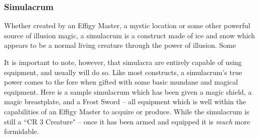 % 
\subsubsection{Simulacrum}
Whether created by an Effigy Master, a mystic location or some other powerful source of illusion magic, a simulacrum is a construct made of ice and snow which appears to be a normal living creature through the power of illusion. Some 

\noindent{}

It is important to note, however, that simulacra are entirely capable of using equipment, and usually will do so. Like most constructs, a simulacrum's true power comes to the fore when gifted with some basic mundane and magical equipment. Here is a sample simulacrum which has been given a magic shield, a magic breastplate, and a Frost Sword -- all equipment which is well within the capabilities of an Effigy Master to acquire or produce. While the simulacrum is still a ``CR 3 Creature" -- once it has been armed and equipped it is \textit{much} more formidable.

